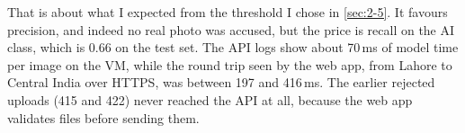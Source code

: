 That is about what I expected from the threshold I chose in \cref{sec:2-5}. It favours precision,
and indeed no real photo was accused, but the price is recall on the AI class, which is 0.66 on the
test set. The API logs show about 70\,ms of model time per image on the VM, while the round trip
seen by the web app, from Lahore to Central India over HTTPS, was between 197 and 416\,ms. The
earlier rejected uploads (415 and 422) never reached the API at all, because the web app validates
files before sending them.
